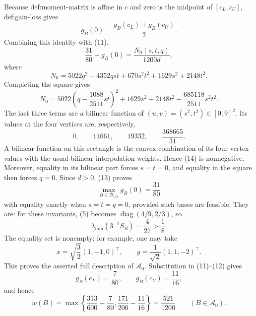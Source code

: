 Because def:moment-matrix is affine in \(c\) and zero is the midpoint of \([c_L,c_U]\), def:gain-loss gives
\[
 g_B(0)=\frac{g_B(c_L)+g_B(c_U)}2.
\]
Combining this identity with (11),
\[
 \frac{31}{80}-g_B(0)=\frac{N_0(s,t,q)}{1200d},
 \tag{13}
\]
where
\[
 N_0=5022q^2-4352qst+670s^2t^2+1629s^2+2148t^2.
\]
Completing the square gives
\[
 N_0
 =5022\left(q-\frac{1088}{2511}st\right)^2
 +1629s^2+2148t^2-\frac{685118}{2511}s^2t^2.
 \tag{14}
\]
The last three terms are a bilinear function of \((u,v)=(s^2,t^2)\in[0,9]^2\).  Its values at the four vertices are, respectively,
\[
 0,
 \qquad14661,
 \qquad19332,
 \qquad\frac{368665}{31}.
 \tag{15}
\]
A bilinear function on this rectangle is the convex combination of its four vertex values with the usual bilinear interpolation weights.  Hence (14) is nonnegative.  Moreover, equality in its bilinear part forces \(s=t=0\), and equality in the square then forces \(q=0\).  Since \(d>0\), (13) proves
\[
 \max_{B\in\mathcal B_{1/8}}g_B(0)=\frac{31}{80}
\]
with equality exactly when \(s=t=q=0\), provided such bases are feasible.  They are: for these invariants, (5) becomes \(\operatorname{diag}(4/9,2/3)\), so
\[
 \lambda_{\min}(3^{-1}S_B)=\frac4{27}>\frac18.
 \tag{16}
\]
The equality set is nonempty; for example, one may take
\[
 x=\sqrt{\frac32}(1,-1,0)^{\top},
 \qquad
 y=\frac1{\sqrt2}(1,1,-2)^{\top}.
\]
This proves the asserted full description of \(\mathcal A_0\).  Substitution in (11)--(12) gives
\[
 g_B(c_L)=\frac7{80},
 \qquad
 g_B(c_U)=\frac{11}{16},
\]
and hence
\[
 w(B)=\max\left\{\frac{313}{600}-\frac7{80},
 \frac{171}{200}-\frac{11}{16}\right\}
 =\frac{521}{1200}
 \qquad(B\in\mathcal A_0).
 \tag{17}
\]

